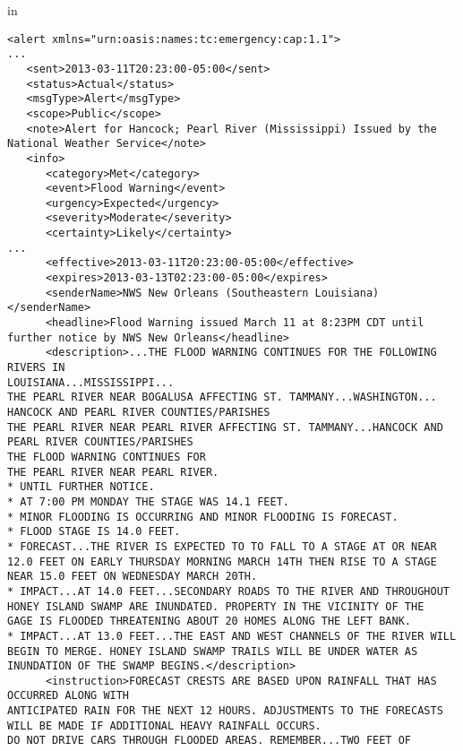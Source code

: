\documentclass{article}
\begin{document}
\begin{figure*}[t!]
 in
\begin{center}
\begin{lstlisting}
<alert xmlns="urn:oasis:names:tc:emergency:cap:1.1">
...
   <sent>2013-03-11T20:23:00-05:00</sent>
   <status>Actual</status>
   <msgType>Alert</msgType>
   <scope>Public</scope>
   <note>Alert for Hancock; Pearl River (Mississippi) Issued by the National Weather Service</note>
   <info>
      <category>Met</category>
      <event>Flood Warning</event>
      <urgency>Expected</urgency>
      <severity>Moderate</severity>
      <certainty>Likely</certainty>
...
      <effective>2013-03-11T20:23:00-05:00</effective>
      <expires>2013-03-13T02:23:00-05:00</expires>
      <senderName>NWS New Orleans (Southeastern Louisiana)</senderName>
      <headline>Flood Warning issued March 11 at 8:23PM CDT until further notice by NWS New Orleans</headline>
      <description>...THE FLOOD WARNING CONTINUES FOR THE FOLLOWING RIVERS IN
LOUISIANA...MISSISSIPPI...
THE PEARL RIVER NEAR BOGALUSA AFFECTING ST. TAMMANY...WASHINGTON...
HANCOCK AND PEARL RIVER COUNTIES/PARISHES
THE PEARL RIVER NEAR PEARL RIVER AFFECTING ST. TAMMANY...HANCOCK AND
PEARL RIVER COUNTIES/PARISHES
THE FLOOD WARNING CONTINUES FOR
THE PEARL RIVER NEAR PEARL RIVER.
* UNTIL FURTHER NOTICE.
* AT 7:00 PM MONDAY THE STAGE WAS 14.1 FEET.
* MINOR FLOODING IS OCCURRING AND MINOR FLOODING IS FORECAST.
* FLOOD STAGE IS 14.0 FEET.
* FORECAST...THE RIVER IS EXPECTED TO TO FALL TO A STAGE AT OR NEAR
12.0 FEET ON EARLY THURSDAY MORNING MARCH 14TH THEN RISE TO A STAGE
NEAR 15.0 FEET ON WEDNESDAY MARCH 20TH.
* IMPACT...AT 14.0 FEET...SECONDARY ROADS TO THE RIVER AND THROUGHOUT
HONEY ISLAND SWAMP ARE INUNDATED. PROPERTY IN THE VICINITY OF THE
GAGE IS FLOODED THREATENING ABOUT 20 HOMES ALONG THE LEFT BANK.
* IMPACT...AT 13.0 FEET...THE EAST AND WEST CHANNELS OF THE RIVER WILL
BEGIN TO MERGE. HONEY ISLAND SWAMP TRAILS WILL BE UNDER WATER AS
INUNDATION OF THE SWAMP BEGINS.</description>
      <instruction>FORECAST CRESTS ARE BASED UPON RAINFALL THAT HAS OCCURRED ALONG WITH
ANTICIPATED RAIN FOR THE NEXT 12 HOURS. ADJUSTMENTS TO THE FORECASTS
WILL BE MADE IF ADDITIONAL HEAVY RAINFALL OCCURS.
DO NOT DRIVE CARS THROUGH FLOODED AREAS. REMEMBER...TWO FEET OF

\end{lstlisting}
\end{center}
\end{figure*}
\end{document}
